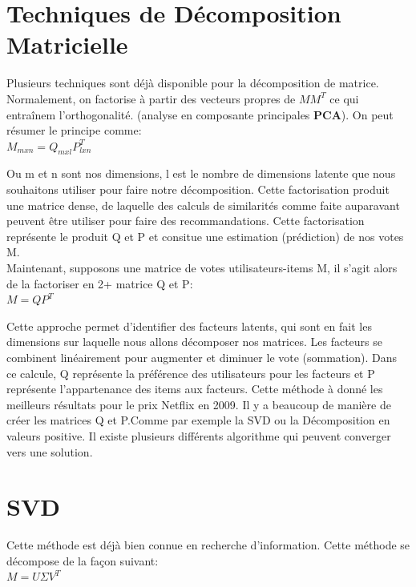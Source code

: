 \documentclass[oneside]{book}
\begin{document}
\section{Techniques de Décomposition Matricielle}
Plusieurs techniques sont déjà disponible pour la décomposition de matrice. Normalement, on factorise à partir des vecteurs propres de $MM^T$ ce qui entraînem l'orthogonalité. (analyse en composante principales \textbf{PCA}). On peut résumer le principe comme:\\

\centering
$M_{mxn} = Q_{mxl} P^T_{lxn}$\\
\justify

Ou m et n sont nos dimensions, l est le nombre de dimensions latente que nous souhaitons utiliser pour faire notre décomposition. Cette factorisation produit une matrice dense, de laquelle des calculs de similarités comme faite auparavant peuvent être utiliser pour faire des recommandations. Cette factorisation représente le produit Q et P et consitue une estimation (prédiction) de nos votes M.\\

Maintenant, supposons une matrice de votes utilisateurs-items M, il s'agit alors de la factoriser en 2+ matrice Q et P:\\

\centering
$M = QP^T$\\
\justify

Cette approche permet d'identifier des facteurs latents, qui sont en fait les dimensions sur laquelle nous allons décomposer nos matrices. Les facteurs se combinent linéairement pour augmenter et diminuer le vote (sommation). Dans ce calcule, Q représente la préférence des utilisateurs pour les facteurs et P représente l'appartenance des items aux facteurs. Cette méthode à donné les meilleurs résultats pour le prix Netflix en 2009. Il y a beaucoup de manière de créer les matrices Q et P.Comme par exemple la SVD ou la Décomposition en valeurs positive. Il existe plusieurs différents algorithme qui peuvent converger vers une solution.
\section{SVD}
Cette méthode est déjà bien connue en recherche d'information. Cette méthode se décompose de la façon suivant:\\

\centering
$M = U\Sigma V^T$\\
\justify
\end{document}
